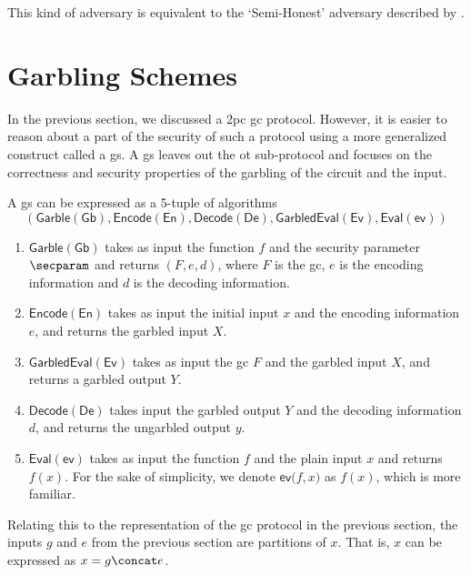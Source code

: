 This kind of adversary is equivalent to the `Semi-Honest' adversary described by \citeauthor{lindell_how_2017} \cite{lindell_how_2017}.

\section{Garbling Schemes}
\label{sec:garblingschemes}

In the previous section, we discussed a \acrshort{2pc} \acrlong{gc} protocol. However, it is easier to reason about a part of the security of such a protocol using a more generalized construct called a \acrlong{gs}. A \acrlong{gs} leaves out the \acrlong{ot} sub-protocol and focuses on the correctness and security properties of the garbling of the circuit and the input.

A \acrlong{gs} \cite{bellare_foundations_2012} can be expressed as a 5-tuple of algorithms 
\[\mathsf{(Garble(Gb), Encode(En), Decode(De), Garbled Eval (Ev), Eval(ev))}\]

\begin{enumerate}
    \item $\mathsf{Garble(Gb)}$ takes as input the function $f$ and the security parameter $\secparam$ and returns $(F, e, d)$, where $F$ is the \acrlong{gc}, $e$ is the encoding information and $d$ is the decoding information. 
    \item $\mathsf{Encode(En)}$ takes as input the initial input $x$ and the encoding information $e$, and returns the garbled input $X$.
    \item $\mathsf{Garbled Eval (Ev)}$ takes as input the \acrlong{gc} $F$ and the garbled input $X$, and returns a garbled output $Y$.  
    \item $\mathsf{Decode(De)}$ takes input the garbled output $Y$ and the decoding information $d$, and returns the ungarbled output $y$.
    \item $\mathsf{Eval(ev)}$ takes as input the function $f$ and the plain input $x$ and returns $f(x)$. For the sake of simplicity, we denote $\mathsf{ev(}f,x\mathsf{)}$ as $f(x)$, which is more familiar.
\end{enumerate}

Relating this to the representation of the \acrlong{gc} protocol in the previous section, the inputs $g$ and $e$ from the previous section are partitions of $x$. That is, $x$ can be expressed as $x=g \concat e$. 

